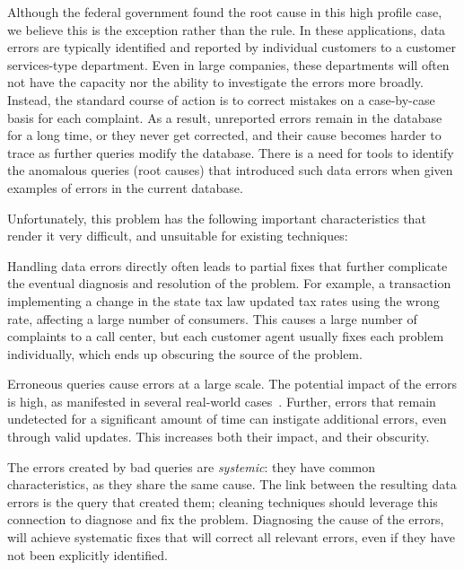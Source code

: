 Although the federal government found the root cause in this high profile case, we believe this is the exception rather than the rule.  In these applications, data errors are typically identified and reported by individual customers to a customer services-type department.  Even in large companies, these departments will often not have the capacity nor the ability to investigate the errors more broadly.  Instead, the standard course of action is to correct mistakes on a case-by-case basis for each complaint. As a result, unreported errors remain in the database for a long time, or they never get corrected, and their cause becomes harder to trace as further queries modify the database.   There is a need for tools to identify the anomalous queries (root causes) that introduced such data errors when given examples of errors in the current database.   

Unfortunately, this problem has the following important characteristics that render it very difficult, and unsuitable for existing techniques:

\begin{description}[leftmargin=*, topsep=0mm, itemsep=0mm]
\item[Obscurity.] Handling data errors directly often leads to partial fixes that further complicate the eventual diagnosis and resolution of the problem. For example, a transaction implementing a change in the state tax law updated tax rates using the wrong rate, affecting a large number of consumers. This causes a large number of complaints to a call center, but each customer agent usually fixes each problem individually, which ends up obscuring the source of the problem.
\item[Large impact.] Erroneous queries cause errors at a large scale. The potential impact of the errors is high, as manifested in several real-world cases~\cite{Yates10, Grady13, sakalerrors}. Further, errors that remain undetected for a significant amount of time can instigate additional errors, even through valid updates. This increases both their impact, and their obscurity.
\item[Systemic errors.] The errors created by bad queries are \emph{systemic}: they have common characteristics, as they share the same cause. The link between the resulting data errors is the query that created them; cleaning techniques should leverage this connection to diagnose and fix the problem. Diagnosing the cause of the errors, will achieve systematic fixes that will correct all relevant errors, even if they have not been explicitly identified.
\end{description}

